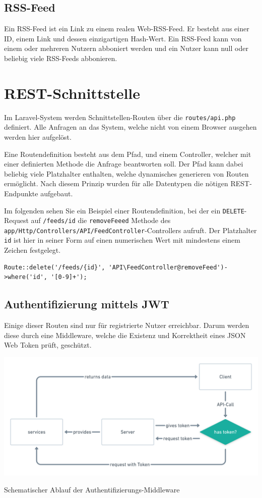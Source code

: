     \subsection{RSS-Feed}
        Ein RSS-Feed ist ein Link zu einem realen Web-RSS-Feed. Er besteht aus einer ID, einem Link und dessen einzigartigen Hash-Wert. Ein RSS-Feed kann von einem oder mehreren Nutzern abboniert werden und ein Nutzer kann null oder beliebig viele RSS-Feeds abbonieren.
    

\section{REST-Schnittstelle}

    Im Laravel-System werden Schnittstellen-Routen über die \texttt{routes/api.php} definiert. Alle Anfragen an das System, welche nicht von einem Browser ausgehen werden hier aufgelöst.
    
    Eine Routendefinition besteht aus dem Pfad, und einem Controller, welcher mit einer definierten Methode die Anfrage beantworten soll. Der Pfad kann dabei beliebig viele Platzhalter enthalten, welche dynamisches generieren von Routen ermöglicht. Nach diesem Prinzip wurden für alle Datentypen die nötigen REST-Endpunkte aufgebaut.
    
    Im folgenden sehen Sie ein Beispiel einer Routendefinition, bei der ein \texttt{DELETE}-Request auf \texttt{/feeds/{id}} die \texttt{removeFeeed} Methode des \texttt{app/Http/Controllers/API/FeedController}-Controllers aufruft. Der Platzhalter \texttt{{id}} ist hier in seiner Form auf einen numerischen Wert mit mindestens einem Zeichen festgelegt.

    \begin{lstlisting}
Route::delete('/feeds/{id}', 'API\FeedController@removeFeed')->where('id', '[0-9]+');
    \end{lstlisting}
    
    \subsection{Authentifizierung mittels JWT}
        Einige dieser Routen sind nur für registrierte Nutzer erreichbar. Darum werden diese durch eine Middleware, welche die Existenz und Korrektheit eines JSON Web Token prüft, geschützt. 
        
        \begin{center}
            \includegraphics[width=\textwidth]{images/collector-jwt-auth-process.png}
            \caption{Schematischer Ablauf der Authentifizierungs-Middleware}
        \end{center}
        
